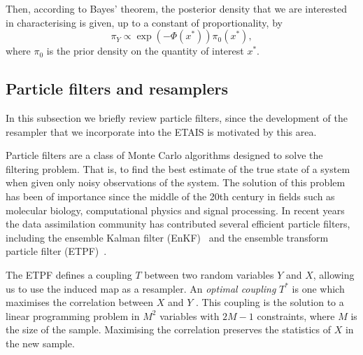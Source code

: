 \documentclass[final]{siamltex}
\begin{document}
Then, according to Bayes' theorem, the posterior density that we
are interested in characterising is given, up to a constant of proportionality, by
\begin{equation*}
	\pi_Y \propto \exp \left ( -\Phi(x^*) \right )\pi_0(x^*),
\end{equation*}
where $\pi_0$ is the prior density on the quantity of interest $x^*$.



\subsection{Particle filters and resamplers}\label{sec:filters}
In this subsection we briefly review particle filters, since the
development of the resampler that we incorporate into the ETAIS is
motivated by this area.

Particle filters are a class of Monte Carlo algorithms designed to
solve the filtering problem. That is, to find the best estimate of the
true state of a system when given only noisy observations of the
system. The solution of this problem has been of importance since the
middle of the 20th century in fields such as molecular biology,
computational physics and signal processing. In recent years the data
assimilation community has contributed several efficient particle
filters, including the ensemble Kalman filter
(EnKF)~\cite{evensen1994sequential} and the ensemble transform
particle filter (ETPF)~\cite{reich2013nonparametric}.

The ETPF defines a coupling $T$ between two random variables $Y$ and
$X$, allowing us to use the induced map as a resampler. An \emph{optimal
coupling} $T^*$ is one which maximises the correlation between $X$ and
$Y$ \cite{cotter2012ensemble}. This coupling is the solution to a
linear programming problem in $M^2$ variables with $2M-1$ constraints,
where $M$ is the size of the sample. Maximising the correlation
preserves the statistics of $X$ in the new sample.
\end{document}
